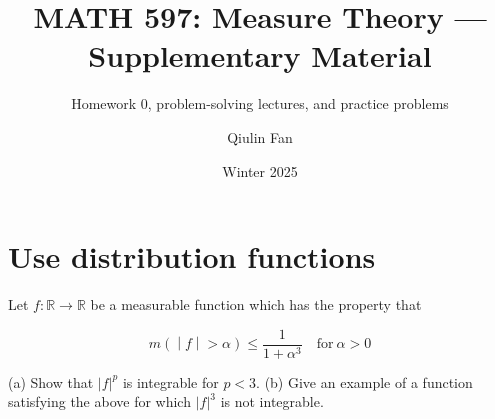 \documentclass{qlnotes-export}
\title{MATH 597: Measure Theory --- Supplementary Material}
\subtitle{Homework 0, problem-solving lectures, and practice problems}
\author{Qiulin Fan}
\date{Winter 2025}
\begin{document}
\mainmatter
\chapter{Use distribution functions}\label{use-distribution-functions}

Let \(f:{\mathbb{R}}\rightarrow{\mathbb{R}}\) be a measurable function which has the property that

\[\left. m( \middle| f \middle| > \alpha) \leq \frac{1}{1 + \alpha^{3}}\quad\text{for}\ \alpha > 0 \right.\]

(a) Show that \(|f|^{p}\) is integrable for \(p < 3\). (b) Give an example of a function satisfying the above for which \(|f|^{3}\) is not integrable.

\printbibliography
\end{document}
